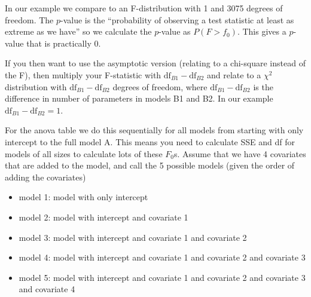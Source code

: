 \documentclass[
  ignorenonframetext,
]{beamer}
\providecommand{\tightlist}{%
  \setlength{\itemsep}{0pt}\setlength{\parskip}{0pt}}
\begin{document}
\begin{frame}
In our example we compare to an F-distribution with 1 and 3075 degrees
of freedom. The \(p\)-value is the ``probability of observing a test
statistic at least as extreme as we have'' so we calculate the
\(p\)-value as \(P(F>f_0)\). This gives a \(p\)-value that is
practically 0.

If you then want to use the asymptotic version (relating to a chi-square
instead of the F), then multiply your F-statistic with
\(\text{df}_{B1}-\text{df}_{B2}\) and relate to a \(\chi^2\)
distribution with \(\text{df}_{B1}-\text{df}_{B2}\) degrees of freedom,
where \(\text{df}_{B1}-\text{df}_{B2}\) is the difference in number of
parameters in models B1 and B2. In our example
\(\text{df}_{B1}-\text{df}_{B2}=1\).
\end{frame}

\begin{frame}
For the anova table we do this sequentially for all models from starting
with only intercept to the full model A. This means you need to
calculate SSE and df for models of all sizes to calculate lots of these
\(F_0\)s. Assume that we have 4 covariates that are added to the model,
and call the 5 possible models (given the order of adding the
covariates)

\begin{itemize}
\tightlist
\item
  model 1: model with only intercept
\item
  model 2: model with intercept and covariate 1
\item
  model 3: model with intercept and covariate 1 and covariate 2
\item
  model 4: model with intercept and covariate 1 and covariate 2 and
  covariate 3
\item
  model 5: model with intercept and covariate 1 and covariate 2 and
  covariate 3 and covariate 4
\end{itemize}
\end{frame}
\end{document}
